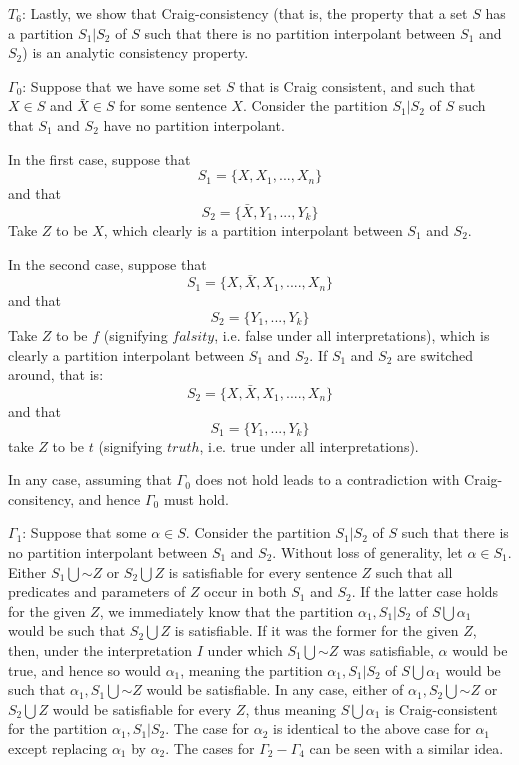 \documentclass{article}
\newcommand*{\oldneg}{\mathord{\sim}}
\theoremstyle{definition}
\begin{document}
$T_6$: Lastly, we show that Craig-consistency (that is, the property that a set $S$ has a partition $S_1|S_2$ of $S$ such that there is no partition interpolant between 
$S_1$ and $S_2$) is an analytic consistency property.


$\Gamma_0$: Suppose that we have some set $S$ that is Craig consistent, and such that $X\in S$ and $\bar{X}\in S$ for some sentence $X$. Consider the partition 
$S_1|S_2$ of $S$ such that $S_1$ and $S_2$ have no partition interpolant.


In the first case, suppose that \[ S_1=\{X,X_1,...,X_n\} \] and that \[ S_2=\{\bar{X},Y_1,...,Y_k\} \]
Take $Z$ to be $X$, which clearly is a partition interpolant between $S_1$ and $S_2$.


In the second case, suppose that \[ S_1=\{X,\bar{X},X_1,....,X_n\} \] and that \[ S_2=\{Y_1,...,Y_k\} \]
Take $Z$ to be $f$ (signifying $falsity$, i.e. false under all interpretations), which is clearly a partition interpolant between $S_1$ and $S_2$. 
If $S_1$ and $S_2$ are switched around, that is:
\[ S_2=\{X,\bar{X},X_1,....,X_n\} \] and that \[ S_1=\{Y_1,...,Y_k\} \] take $Z$ to be $t$ (signifying $truth$, i.e. true under all interpretations).


In any case, assuming that $\Gamma_0$ does not hold leads to a contradiction with Craig-consitency, and hence $\Gamma_0$ must hold.

 
$\Gamma_1$: Suppose that some $\alpha\in S$. Consider the partition $S_1|S_2$ of $S$ such that there is no partition interpolant between $S_1$ and $S_2$. Without 
loss of generality, let $\alpha\in S_1$. Either $S_1\bigcup {\oldneg Z}$ or $S_2\bigcup {Z}$ is satisfiable for every sentence $Z$ such that all predicates and 
parameters of $Z$ occur in both $S_1$ and $S_2$. If the latter case holds for the given $Z$, we immediately know that the partition ${\alpha_1,S_1}|S_2$ of 
$S\bigcup {\alpha_1}$ would be such that $S_2\bigcup {Z}$ is satisfiable. If it was the former for the given $Z$, then, under the 
interpretation $I$ under which $S_1\bigcup {\oldneg Z}$ was satisfiable, $\alpha$ would be true, and hence so would $\alpha_1$, meaning 
the partition ${\alpha_1,S_1}|S_2$ of $S\bigcup {\alpha_1}$ would be such that ${\alpha_1,S_1}\bigcup {\oldneg Z}$ would be satisfiable. In any case, either 
of ${\alpha_1,S_2}\bigcup {\oldneg Z}$ or $S_2\bigcup {Z}$ would be satisfiable for every $Z$, thus meaning $S\bigcup {\alpha_1}$ is Craig-consistent 
for the partition ${\alpha_1,S_1}|S_2$. The case for $\alpha_2$ is identical to the above case for $\alpha_1$ except replacing $\alpha_1$ by $\alpha_2$.
The cases for $\Gamma_2-\Gamma_4$ can be seen with a similar idea.
\end{document}
